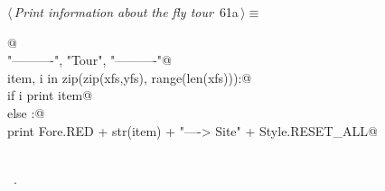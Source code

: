 \documentclass[11.5pt]{report}
\begin{document}
\vspace{-0.8cm} \newchunk
\begin{flushleft} \small\label{scrap87}\raggedright\small
{} $\langle\,${\itshape Print information about the fly tour}\nobreak\ {\footnotesize {61a}}$\,\rangle\equiv$
\vspace{-1ex}
\begin{list}{}{} \item
\mbox{}\verb@   @\\
\mbox{}\verb@print "\n----------", "\nFly Tour", "\n----------"@\\
\mbox{}\verb@for item, i in zip(zip(xfs,yfs), range(len(xfs))):@\\
\mbox{}\verb@   if i%2 == 0:@\\
\mbox{}\verb@       print item@\\
\mbox{}\verb@   else :@\\
\mbox{}\verb@       print Fore.RED + str(item) + "----> Site" +  Style.RESET_ALL@\\
\mbox{}\verb@@\\
\mbox{}\verb@@{\NWsep}
\end{list}
\vspace{-1.5ex}
\footnotesize
\begin{list}{}{\setlength{\itemsep}{-\parsep}\setlength{\itemindent}{-\leftmargin}}
\item \NWtxtMacroRefIn\ .

\item{}
\end{list}
\vspace{4ex}
\end{flushleft}
\end{document}
